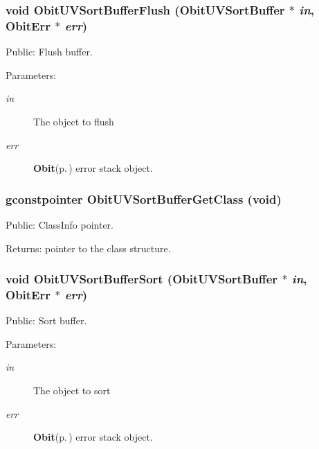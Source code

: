 \subsubsection{\setlength{\rightskip}{0pt plus 5cm}void Obit\-UVSort\-Buffer\-Flush ({\bf Obit\-UVSort\-Buffer} $\ast$ {\em in}, {\bf Obit\-Err} $\ast$ {\em err})}\label{ObitUVSortBuffer_8h_a15}


Public: Flush buffer. 

\begin{Desc}
\item[Parameters:]
\begin{description}
\item[{\em in}]The object to flush \item[{\em err}]{\bf Obit}{\rm (p.\,\pageref{structObit})} error stack object. \end{description}
\end{Desc}
\subsubsection{\setlength{\rightskip}{0pt plus 5cm}gconstpointer Obit\-UVSort\-Buffer\-Get\-Class (void)}\label{ObitUVSortBuffer_8h_a10}


Public: Class\-Info pointer. 

\begin{Desc}
\item[Returns:]pointer to the class structure. \end{Desc}
\subsubsection{\setlength{\rightskip}{0pt plus 5cm}void Obit\-UVSort\-Buffer\-Sort ({\bf Obit\-UVSort\-Buffer} $\ast$ {\em in}, {\bf Obit\-Err} $\ast$ {\em err})}\label{ObitUVSortBuffer_8h_a14}


Public: Sort buffer. 

\begin{Desc}
\item[Parameters:]
\begin{description}
\item[{\em in}]The object to sort \item[{\em err}]{\bf Obit}{\rm (p.\,\pageref{structObit})} error stack object. \end{description}
\end{Desc}
